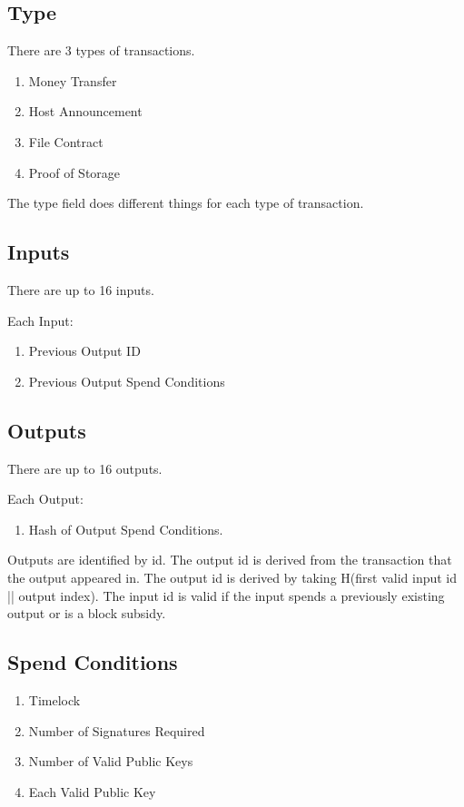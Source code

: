 \documentclass[twocolumn]{article}
\begin{document}
\subsection{Type}
There are 3 types of transactions.
\begin{enumerate}
	\item Money Transfer
	\item Host Announcement
	\item File Contract
	\item Proof of Storage
\end{enumerate}

The type field does different things for each type of transaction.

\subsection{Inputs}
There are up to 16 inputs.

Each Input:
\begin{enumerate}
	\item Previous Output ID
	\item Previous Output Spend Conditions
\end{enumerate}

\subsection{Outputs}
There are up to 16 outputs.

Each Output:
\begin{enumerate}
	\item Hash of Output Spend Conditions.
\end{enumerate}

Outputs are identified by id.
The output id is derived from the transaction that the output appeared in.
The output id is derived by taking H(first valid input id || output index).
The input id is valid if the input spends a previously existing output or is a block subsidy.

\subsection{Spend Conditions}
\begin{enumerate}
	\item Timelock
	\item Number of Signatures Required
	\item Number of Valid Public Keys
	\item Each Valid Public Key
\end{enumerate}
\end{document}
